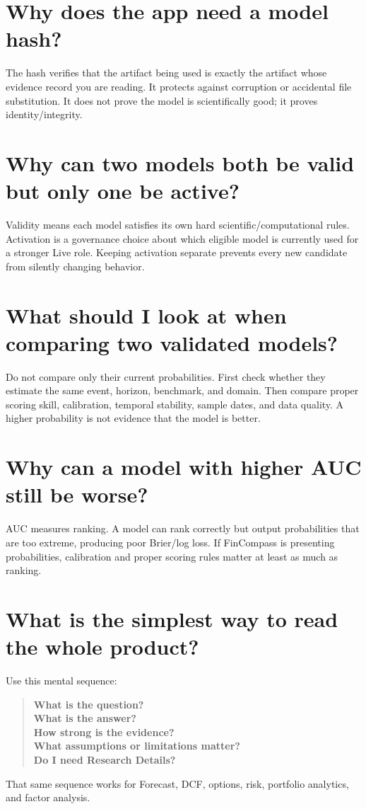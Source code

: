 \documentclass[11pt]{article}
\begin{document}
\section{Why does the app need a model hash?}
The hash verifies that the artifact being used is exactly the artifact whose evidence record you are reading. It protects against corruption or accidental file substitution. It does not prove the model is scientifically good; it proves identity/integrity.

\section{Why can two models both be valid but only one be active?}
Validity means each model satisfies its own hard scientific/computational rules. Activation is a governance choice about which eligible model is currently used for a stronger Live role. Keeping activation separate prevents every new candidate from silently changing behavior.

\section{What should I look at when comparing two validated models?}
Do not compare only their current probabilities. First check whether they estimate the same event, horizon, benchmark, and domain. Then compare proper scoring skill, calibration, temporal stability, sample dates, and data quality. A higher probability is not evidence that the model is better.

\section{Why can a model with higher AUC still be worse?}
AUC measures ranking. A model can rank correctly but output probabilities that are too extreme, producing poor Brier/log loss. If FinCompass is presenting probabilities, calibration and proper scoring rules matter at least as much as ranking.

\section{What is the simplest way to read the whole product?}
Use this mental sequence:
\begin{quote}
\textbf{What is the question?}\\
\textbf{What is the answer?}\\
\textbf{How strong is the evidence?}\\
\textbf{What assumptions or limitations matter?}\\
\textbf{Do I need Research Details?}
\end{quote}
That same sequence works for Forecast, DCF, options, risk, portfolio analytics, and factor analysis.
\end{document}
